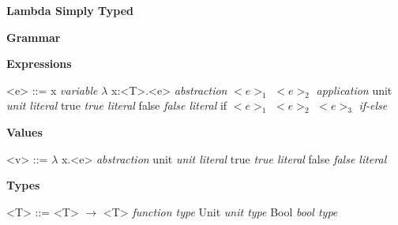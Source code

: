 \documentclass[11pt,oneside]{book}
\newcommand{\synlabel}[1]{\hfill \textit{#1}}
\begin{document}
\frontmatter

\mainmatter

\pagebreak

\begin{center}
    {
        \bf
        \huge
        Lambda Simply Typed
    }
\end{center}

\begin{center}
{
    \bf
    \huge
    Grammar
}
\end{center}


\setlength{\grammarindent}{10em} %

\setlength{\grammarparsep}{5pt} %

\textbf{Expressions}

\begin{grammar}

    <e> ::=  x                            \synlabel{variable}
        \alt $\lambda$ x:<T>.<e>          \synlabel{abstraction}
        \alt $<e>_1$ $<e>_2$              \synlabel{application}
        \alt unit                         \synlabel{unit literal}
        \alt true                         \synlabel{true literal}
        \alt false                        \synlabel{false literal}
        \alt if $<e>_1$ $<e>_2$ $<e>_3$   \synlabel{if-else}

\end{grammar}

\textbf{Values}

\begin{grammar}

    <v> ::=  $\lambda$ x.<e>            \synlabel{abstraction}
        \alt unit                       \synlabel{unit literal}
        \alt true                       \synlabel{true literal}
        \alt false                      \synlabel{false literal}

\end{grammar}

\textbf{Types}

\begin{grammar}

    <T> ::= <T> $\rightarrow$ <T>     \synlabel{function type}
        \alt Unit                     \synlabel{unit type}
        \alt Bool                     \synlabel{bool type}

\end{grammar}
\end{document}
